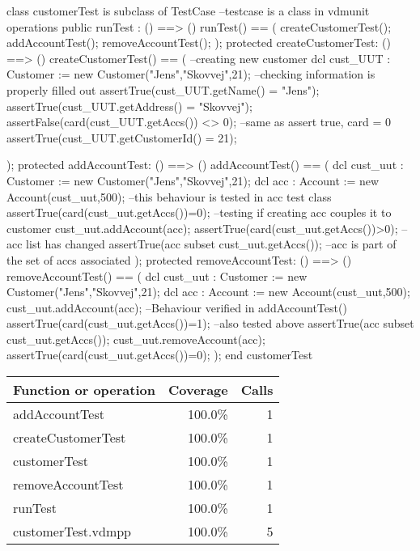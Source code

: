 \documentclass[a4paper]{article}
\begin{document}
\title{}
\author{}
\begin{vdm_al}

class customerTest is subclass of TestCase --testcase is a class in vdmunit
operations
    public runTest : () ==> ()
    runTest() == (
        createCustomerTest();
        addAccountTest();
        removeAccountTest();
    );
    protected createCustomerTest: () ==> ()
    createCustomerTest() == (
      --creating new customer
      dcl cust_UUT : Customer := new Customer("Jens","Skovvej",21);
      --checking information is properly filled out
      assertTrue(cust_UUT.getName() = "Jens");
      assertTrue(cust_UUT.getAddress() = "Skovvej");
      assertFalse(card(cust_UUT.getAccs()) <> 0); --same as assert true, card = 0
      assertTrue(cust_UUT.getCustomerId() = 21);

    );
    protected addAccountTest: () ==> ()
    addAccountTest() == (
      dcl cust_uut : Customer := new Customer("Jens","Skovvej",21);
      dcl acc : Account := new Account(cust_uut,500); --this behaviour is tested in acc test class
      assertTrue(card(cust_uut.getAccs())=0); --testing if creating acc couples it to customer
      cust_uut.addAccount(acc);
      assertTrue(card(cust_uut.getAccs())>0); --acc list has changed
      assertTrue({acc} subset cust_uut.getAccs()); --acc is part of the set of accs associated
    );
    protected removeAccountTest: () ==> ()
    removeAccountTest() == (
      dcl cust_uut : Customer := new Customer("Jens","Skovvej",21);
      dcl acc : Account := new Account(cust_uut,500); 
      cust_uut.addAccount(acc); --Behaviour verified in addAccountTest()
      assertTrue(card(cust_uut.getAccs())=1); --also tested above
      assertTrue({acc} subset cust_uut.getAccs());
      cust_uut.removeAccount(acc);
      assertTrue(card(cust_uut.getAccs())=0);
    );
end customerTest
\end{vdm_al}
\bigskip
\begin{longtable}{|l|r|r|}
\hline
Function or operation & Coverage & Calls \\
\hline
\hline
addAccountTest & 100.0\% & 1 \\
\hline
createCustomerTest & 100.0\% & 1 \\
\hline
customerTest & 100.0\% & 1 \\
\hline
removeAccountTest & 100.0\% & 1 \\
\hline
runTest & 100.0\% & 1 \\
\hline
\hline
customerTest.vdmpp & 100.0\% & 5 \\
\hline
\end{longtable}
\end{document}
